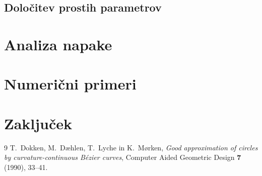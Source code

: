 \documentclass[a4paper,11pt]{article}
\theoremstyle{definition}
\theoremstyle{remark}
\begin{document}
\subsection{Določitev prostih parametrov}

\section{Analiza napake}
\label{sec:napaka}

\section{Numerični primeri}
\label{sec:primeri}

\section{Zaključek}
\label{sec:zakljucek}

\begin{thebibliography}{9}
T.~Dokken, M.~Dæhlen, T.~Lyche in K.~Mørken,
\emph{Good approximation of circles by curvature-continuous Bézier curves},
Computer Aided Geometric Design \textbf{7} (1990), 33--41.
\end{thebibliography}
\end{document}
